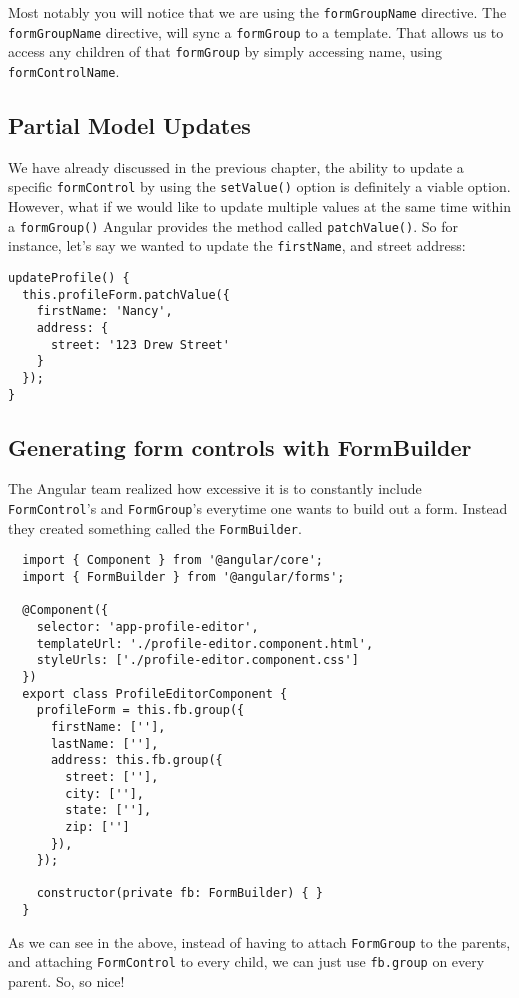Most notably you will notice that we are using the \lstinline{formGroupName}
directive. The \lstinline{formGroupName} directive, will sync a 
\lstinline{formGroup} to a template. That allows us to access any children of
that \lstinline{formGroup} by simply accessing name, using \lstinline{formControlName}. 

\subsection{ Partial Model Updates }
We have already discussed in the previous chapter, the ability to update a 
specific \lstinline{formControl} by using the \lstinline{setValue()} option is 
definitely a viable option. However, what if we would like to update multiple 
values at the same time within a \lstinline{formGroup()} Angular provides the 
method called \lstinline{patchValue()}. So for instance, let's say we wanted
to update the \lstinline{firstName}, and street address: 
\begin{lstlisting}
updateProfile() {
  this.profileForm.patchValue({
    firstName: 'Nancy',
    address: {
      street: '123 Drew Street'
    }
  });
}
\end{lstlisting}

\subsection{ Generating form controls with FormBuilder }
The Angular team realized how excessive it is to constantly include \lstinline{FormControl}'s
and \lstinline{FormGroup}'s everytime one wants to build out a form. Instead
they created something called the \lstinline{FormBuilder}. 
\begin{lstlisting}
  import { Component } from '@angular/core';
  import { FormBuilder } from '@angular/forms';
  
  @Component({
    selector: 'app-profile-editor',
    templateUrl: './profile-editor.component.html',
    styleUrls: ['./profile-editor.component.css']
  })
  export class ProfileEditorComponent {
    profileForm = this.fb.group({
      firstName: [''],
      lastName: [''],
      address: this.fb.group({
        street: [''],
        city: [''],
        state: [''],
        zip: ['']
      }),
    });
  
    constructor(private fb: FormBuilder) { }
  }  
\end{lstlisting}

As we can see in the above, instead of having to attach \lstinline{FormGroup} to the
parents, and attaching \lstinline{FormControl} to every child, we can just use 
\lstinline{fb.group} on every parent. So, so nice!
